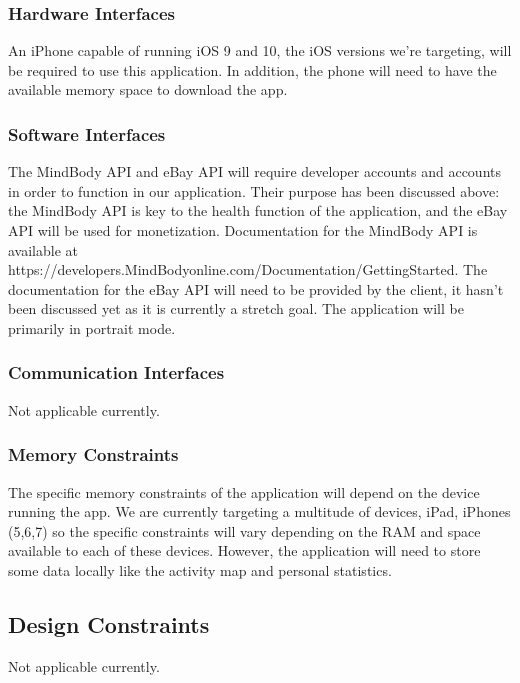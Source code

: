 \documentclass[letterpaper,10pt,titlepage]{article}
\begin{document}
\subsubsection{Hardware Interfaces}

An iPhone capable of running iOS 9 and 10, the iOS versions we're targeting, will be required to use this application. In addition, the phone will need to have the available memory space to download the app.

\subsubsection{Software Interfaces}

The MindBody API and eBay API will require developer accounts and accounts in order to function in our application. Their purpose has been discussed above: the MindBody API is key to the health function of the application, and the eBay API will be used for monetization. Documentation for the MindBody API is available at https://developers.MindBodyonline.com/Documentation/GettingStarted. The documentation for the eBay API will need to be provided by the client, it hasn't been discussed yet as it is currently a stretch goal. The application will be primarily in portrait mode.

\subsubsection{Communication Interfaces}

Not applicable currently.

\subsubsection{Memory Constraints}

The specific memory constraints of the application will depend on the device running the app. We are currently targeting a multitude of devices, iPad, iPhones (5,6,7) so the specific constraints will vary depending on the RAM and space available to each of these devices. However, the application will need to store some data locally like the activity map and personal statistics.

\subsection{Design Constraints}

Not applicable currently.
\end{document}
